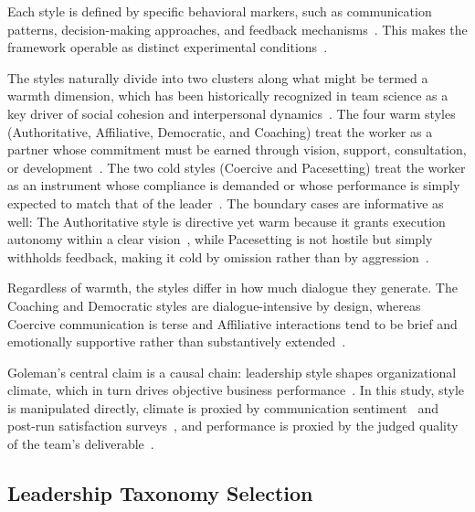 Each style is defined by specific behavioral markers, such as communication patterns, decision-making approaches, and feedback mechanisms~\cite{goleman2000leadership}.
This makes the framework operable as distinct experimental conditions~\cite{goleman2000leadership, kwak2026leadershipcoordinationcontrolbehavioral}.

The styles naturally divide into two clusters along what might be termed a warmth dimension, which has been historically recognized in team science as a key driver of social cohesion and interpersonal dynamics~\cite{barrick1998personalityteamwork, mccrae1987fivefactorpersonalityvalidation, goldberg1990bigfivepersonalities}.
The four warm styles (Authoritative, Affiliative, Democratic, and Coaching) treat the worker as a partner whose commitment must be earned through vision, support, consultation, or development~\cite{goleman2000leadership}.
The two cold styles (Coercive and Pacesetting) treat the worker as an instrument whose compliance is demanded or whose performance is simply expected to match that of the leader~\cite{goleman2000leadership}.
The boundary cases are informative as well: 
The Authoritative style is directive yet warm because it grants execution autonomy within a clear vision~\cite{goleman2000leadership},
while Pacesetting is not hostile but simply withholds feedback, making it cold by omission rather than by aggression~\cite{goleman2000leadership}.

Regardless of warmth, the styles differ in how much dialogue they generate.
The Coaching and Democratic styles are dialogue-intensive by design, whereas Coercive communication is terse and Affiliative interactions tend to be brief and emotionally supportive rather than substantively extended~\cite{goleman2000leadership, kwak2026leadershipcoordinationcontrolbehavioral}.

Goleman's central claim is a causal chain: leadership style shapes organizational climate, which in turn drives objective business performance~\cite{goleman2000leadership}.
In this study, style is manipulated directly, climate is proxied by communication sentiment~\cite{hutto2014vader} and post-run satisfaction surveys~\cite{wageman2005teamdiagnosticsurvey}, and performance is proxied by the judged quality of the team's deliverable~\cite{zheng2023judgingllmasajudgemtbenchchatbot}.

\subsection{Leadership Taxonomy Selection}
\label{subsec:leadership-taxonomy-selection}

